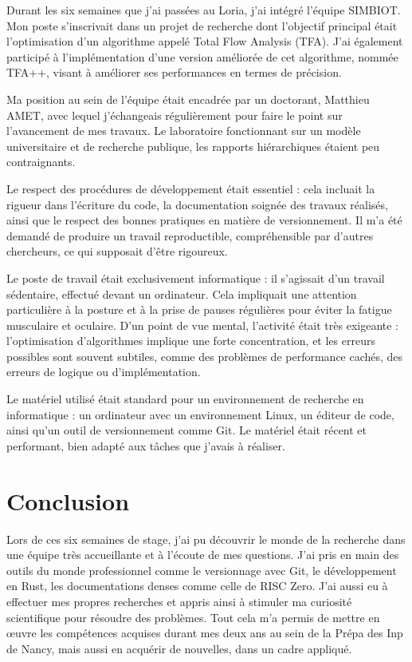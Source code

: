 \documentclass[12pt]{report}
\begin{document}
Durant les six semaines que j'ai passées au Loria, j'ai intégré l'équipe SIMBIOT. Mon poste s'inscrivait dans un projet de recherche dont l'objectif principal était l'optimisation d'un algorithme appelé Total Flow Analysis (TFA). J'ai également participé à l'implémentation d'une version améliorée de cet algorithme, nommée TFA++, visant à améliorer ses performances en termes de précision.

\bigskip

Ma position au sein de l'équipe était encadrée par un doctorant, Matthieu AMET, avec lequel j'échangeais régulièrement pour faire le point sur l'avancement de mes travaux.  Le laboratoire fonctionnant sur un modèle universitaire et de recherche publique, les rapports hiérarchiques étaient peu contraignants.

\bigskip

Le respect des procédures de développement était essentiel : cela incluait la rigueur dans l'écriture du code, la documentation soignée des travaux réalisés, ainsi que le respect des bonnes pratiques en matière de versionnement. Il m'a été demandé de produire un travail reproductible, compréhensible par d'autres chercheurs, ce qui supposait d'être rigoureux.

\bigskip

Le poste de travail était exclusivement informatique : il s'agissait d'un travail sédentaire, effectué devant un ordinateur. Cela impliquait une attention particulière à la posture et à la prise de pauses régulières pour éviter la fatigue musculaire et oculaire. D'un point de vue mental, l'activité était très exigeante : l'optimisation d'algorithmes implique une forte concentration, et les erreurs possibles sont souvent subtiles, comme des problèmes de performance cachés, des erreurs de logique ou d'implémentation.

\bigskip

Le matériel utilisé était standard pour un environnement de recherche en informatique : un ordinateur avec un environnement Linux, un éditeur de code, ainsi qu'un outil de versionnement comme Git. Le matériel était récent et performant, bien adapté aux tâches que j'avais à réaliser. 

\chapter{Conclusion}

Lors de ces six semaines de stage, j'ai pu découvrir le monde de la recherche dans une équipe très accueillante et à l'écoute de mes questions.
J'ai pris en main des outils du monde professionnel comme le versionnage avec Git, le développement en Rust, les documentations denses comme celle de RISC Zero. J'ai aussi eu à effectuer mes propres recherches et appris ainsi à stimuler ma curiosité scientifique pour résoudre des problèmes. 
Tout cela m'a permis de mettre en œuvre les compétences acquises durant mes deux ans au sein de la Prépa des Inp de Nancy, mais aussi en acquérir de nouvelles, dans un cadre appliqué.
\end{document}
